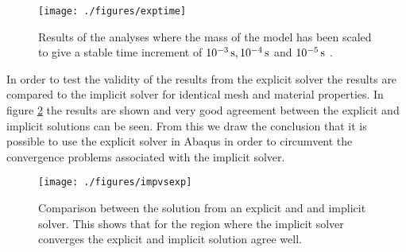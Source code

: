 \documentclass[grain_boundary_law.tex]{subfiles}
\begin{document}
\begin{figure}[htpb!]
\centering
\texttt{[image: ./figures/exptime]}
\caption{Results of the analyses where the mass of the model has been scaled to give a stable time increment of $\unit[10^{-3}]{s}, \unit[10^{-4}]{s}$ and $ \unit[10^{-5}]{s}$ .}
\label{fig:mass_scale}
\end{figure}

In order to test the validity of the results from the explicit solver the results are compared to the implicit solver for identical mesh and material properties. In figure \ref{fig:impvsexp} the results are shown and very good agreement between the explicit and implicit solutions can be seen. From this we draw the conclusion that it is possible to use the explicit solver in Abaqus in order to circumvent the convergence problems associated with the implicit solver.

\begin{figure}[htpb!]
\centering
\texttt{[image: ./figures/impvsexp]}
\caption{Comparison between the solution from an explicit and and implicit solver. This shows that for the region where the implicit solver converges the explicit and implicit solution agree well.}
\label{fig:impvsexp}
\end{figure}
\end{document}
